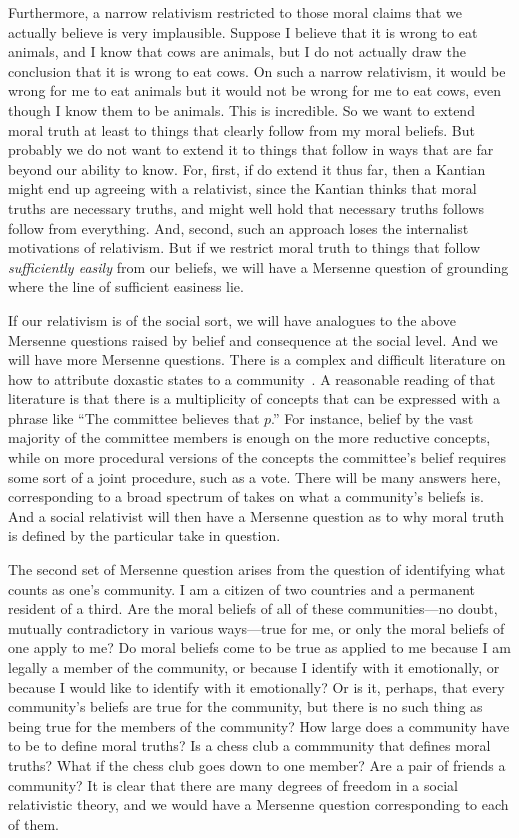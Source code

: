 Furthermore, a narrow relativism restricted to those moral claims that we actually believe is very implausible. Suppose I believe that it is wrong
to eat animals, and I know that cows are animals, but I do not actually draw the conclusion that it is wrong to eat cows.
On such a narrow relativism, it would be wrong for me to eat animals but it would not be wrong for me to eat cows, even though
I know them to be animals. This is incredible. So we want to extend moral truth at least to things that clearly follow from my moral beliefs.
But probably we do not want to extend it to things that follow in ways that are far beyond our ability to know. For, first,
if do extend it thus far, then a Kantian might end up agreeing with a relativist, since the Kantian thinks that moral truths are
necessary truths, and might well hold that necessary truths follows follow from everything. And, second, such an
approach loses the 
internalist motivations of relativism. But if we restrict moral truth to things that follow \textit{sufficiently easily} from
our beliefs, we will have a Mersenne question of grounding where the line of sufficient easiness lie.

If our relativism is of the social sort, we will have analogues to the above Mersenne questions raised by belief and consequence at the social level.  And we 
will have more Mersenne questions. There is a complex and difficult literature on how to attribute doxastic states to a community~\parencite{Quinton1976, Hakli2006, deRidder2022, Lackey2020, Tuomela1992, Gilbert1987, Gilbert2006}. A reasonable
reading of that literature is that there is a multiplicity of concepts that can be expressed with a phrase like ``The committee believes 
that $p$.'' For instance, belief by the vast majority of the committee members is enough on the more reductive concepts, 
while on more procedural versions of the concepts the committee's belief requires some sort of a joint procedure, such as a vote. 
There will be many answers here, corresponding to a broad spectrum of takes on what a community's beliefs is. And a social relativist
will then have a Mersenne question as to why moral truth is defined by the particular take in question.

The second set of Mersenne question arises from the question of identifying what counts as one's community. I am a citizen of two countries
and a permanent resident of a third. Are the moral beliefs of all of these communities---no doubt, mutually contradictory in various ways---true
for me, or only the moral beliefs of one apply to me? Do moral beliefs come to be true as applied to me because I am legally a member of the community, or because I identify
with it emotionally, or because I would like to identify with it emotionally? Or is it, perhaps, that every community's beliefs are true
for the community, but there is no such thing as being true for the members of the community? 
How large does a community have to be to define moral truths? Is a chess
club a commmunity that defines moral truths? What if the chess club goes down to one member? Are a pair of friends a community? It is clear
that there are many degrees of freedom in a social relativistic theory, and we would have a Mersenne question corresponding to each of them.

